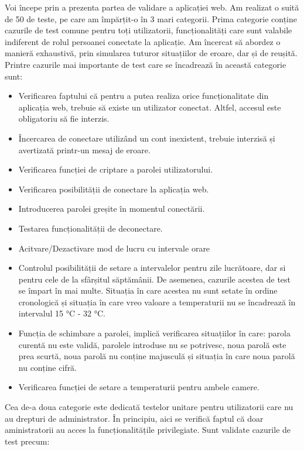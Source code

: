 	Voi începe prin a prezenta partea de validare a aplicației web. Am realizat o suită de 50 de teste, pe care am împărțit-o în 3 mari categorii. Prima categorie conține cazurile de test comune pentru toți utilizatorii, funcționalități care sunt valabile indiferent de rolul persoanei conectate la aplicație. Am încercat să abordez o manieră exhaustivă, prin simularea tuturor situațiilor de eroare, dar și de reușită. Printre cazurile mai importante de test care se încadrează în această categorie sunt:

	\begin{itemize}
			\setlength{\itemindent}{2em}
			\itemsep0em
			\item Verificarea faptului că pentru a putea realiza orice funcționalitate din aplicația web, trebuie să existe un utilizator conectat. Altfel, accesul este obligatoriu să fie interzis.
			\item Încercarea de conectare utilizând un cont inexistent, trebuie interzisă și avertizată printr-un mesaj de eroare.
			\item Verificarea funcției de criptare a parolei utilizatorului.
			\item Verificarea posibilității de conectare la aplicația web.
			\item Introducerea parolei greșite în momentul conectării.
			\item Testarea funcționalității de deconectare.
			\item Acitvare/Dezactivare mod de lucru cu intervale orare
			\item Controlul posibilității de setare a intervalelor pentru zile lucrătoare, dar si pentru cele de la sfârșitul săptămânii. De asemenea, cazurile acestea de test se împart în mai multe. Situația în care acestea nu sunt setate în ordine cronologică și situația în care vreo valoare a temperaturii nu se încadrează în intervalul 15 °C - 32 °C.
			\item Funcția de schimbare a parolei, implică verificarea situațiilor în care: parola curentă nu este validă, parolele introduse nu se potrivesc, noua parolă este prea scurtă, noua parolă nu conține majusculă și situația în care noua parolă nu conține cifră.
			\item Verificarea funcției de setare a temperaturii pentru ambele camere.
	\end{itemize} 

\vspace{2em}

	Cea de-a doua categorie este dedicată testelor unitare pentru utilizatorii care nu au drepturi de administrator. În principiu, aici se verifică faptul că doar aministratorii au acces la funcționalitățile privilegiate. Sunt validate cazurile de test precum:
 
